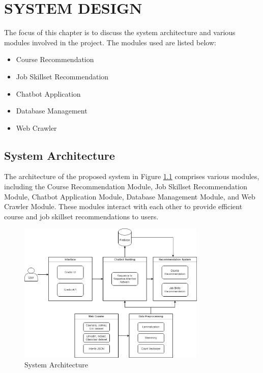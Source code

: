 \chapter{\uppercase{System Design}} %
\label{ch:chap3} %

The focus of this chapter is to discuss the system architecture and various modules involved in the project. The modules used are listed below:

\begin{itemize}
    \item Course Recommendation
    \item Job Skillset Recommendation
    \item Chatbot Application
    \item Database Management
    \item Web Crawler
\end{itemize}

\section{System Architecture}
The architecture of the proposed system in Figure \ref{fig:system_architecture} comprises various modules, including the Course Recommendation Module, Job Skillset Recommendation Module, Chatbot Application Module, Database Management Module, and Web Crawler Module. These modules interact with each other to provide efficient course and job skillset recommendations to users.

\begin{figure}[h]
\centering
\includegraphics[width=0.8\textwidth]{3/system.png}
\caption{System Architecture}
\label{fig:system_architecture}
\end{figure}

